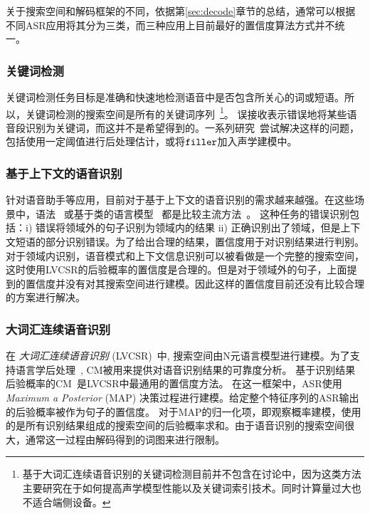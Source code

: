   关于搜索空间和解码框架的不同，依据第\ref{sec:decode}章节的总结，通常可以根据不同ASR应用将其分为三类，而三种应用上目前最好的置信度算法方式并不统一。

  \subsubsection{关键词检测}
    \label{Sec:kws-task}

      关键词检测任务目标是准确和快速地检测语音中是否包含所关心的词或短语。所以，关键词检测的搜索空间是所有的关键词序列~\footnote{基于大词汇连续语音识别的关键词检测目前并不包含在讨论中，因为这类方法主要研究在于如何提高声学模型性能以及关键词索引技术。同时计算量过大也不适合端侧设备。}。 误接收表示错误地将某些语音段识别为关键词，而这并不是希望得到的。一系列研究~\cite{young1994detecting,chen2014small}尝试解决这样的问题，包括使用一定阈值进行后处理估计，或将$\tt filler$加入声学建模中。

  \subsubsection{基于上下文的语音识别}
  \label{Sec:task-task}

  针对语音助手等应用，目前对于基于上下文的语音识别的需求越来越强。在这些场景中，语法~\cite{woodland1994large} 或基于类的语言模型~\cite{ward1996class} 都是比较主流方法~\cite{vasserman2016contextual}。
  这种任务的错误识别包括：i) 错误将领域外的句子识别为领域内的结果 ii) 正确识别出了领域，但是上下文短语的部分识别错误。为了给出合理的结果，置信度用于对识别结果进行判别。对于领域内识别，语音模式和上下文信息识别可以被看做是一个完整的搜索空间，这时使用LVCSR的后验概率的置信度是合理的。但是对于领域外的句子，上面提到的置信度并没有对其搜索空间进行建模。因此这样的置信度目前还没有比较合理的方案进行解决。

  \subsubsection{大词汇连续语音识别}
  \label{Sec:lvcsr-task}

  在 {\em 大词汇连续语音识别} (LVCSR)~\cite{woodland1994large}中,  搜索空间由N元语言模型进行建模。为了支持语言学后处理~\cite{hakkani2006beyond}, CM被用来提供对语音识别结果的可靠度分析。
  基于识别结果后验概率的CM~\cite{wessel2001confidence}是LVCSR中最通用的置信度方法。
  在这一框架中，ASR使用 {\em Maximum a Posterior} (MAP) 决策过程进行建模。给定整个特征序列的ASR输出的后验概率被作为句子的置信度。 对于MAP的归一化项，即观察概率建模，使用的是所有识别结果组成的搜索空间的后验概率求和。由于语音识别的搜索空间很大，通常这一过程由解码得到的词图来进行限制。


